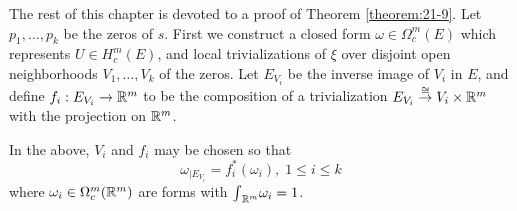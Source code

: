 The rest of this chapter is devoted to a proof of Theorem \ref{theorem:21-9}. Let ${p}_{1},\ldots,{p}_{k}$ be the zeros 
of $s$. First we construct a closed form $\omega  \in  {\Omega }_{c}^{m}( E)$ which represents $U \in  H_c^{m}( E)$, 
and local trivializations of $\xi$ over disjoint open neighborhoods ${V}_{1},\ldots,{V}_{k}$ of the zeros. 
Let ${E}_{V_i}$ be the inverse image of $V_i$ in $E$, and define $f_i : {E}_{V_i} \rightarrow  {{\ensuremath{\mathbb{R}}}}^{m}$ to be 
the composition of a trivialization ${E}_{V_i}\overset{ \cong  }{ \rightarrow  }V_i \times  {{\ensuremath{\mathbb{R}}}}^{m}$ with the projection 
on ${{\mathbb{R}}}^{m}$.

\begin{lemma}\label{lemma:21-14}
  In the above, $V_i$ and $f_i$ may be chosen so that
  \[
    {\omega }_{\mid {E}_{V_i}} = f_i^*( {\omega }_{i}),\;1 \leq  i \leq  k
  \]
  where ${\omega }_{i} \in  {\Omega }_{c}^{m}( {{\mathbb{R}}}^{m})$ are forms 
  with ${\int }_{{{\mathbb{R}}}^{m}}{\omega }_{i} = 1$.
\end{lemma}

